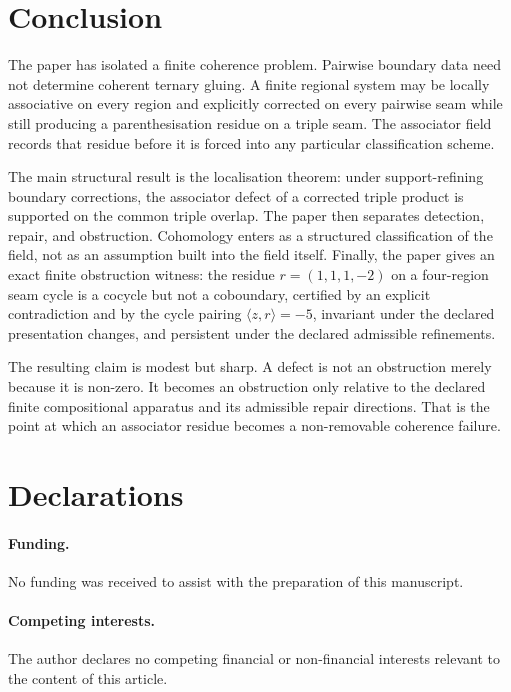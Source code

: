 \documentclass[11pt]{article}
\begin{document}
\section{Conclusion}

The paper has isolated a finite coherence problem. Pairwise boundary data need not determine coherent ternary gluing. A finite regional system may be locally associative on every region and explicitly corrected on every pairwise seam while still producing a parenthesisation residue on a triple seam. The associator field records that residue before it is forced into any particular classification scheme.

The main structural result is the localisation theorem: under support-refining boundary corrections, the associator defect of a corrected triple product is supported on the common triple overlap. The paper then separates detection, repair, and obstruction. Cohomology enters as a structured classification of the field, not as an assumption built into the field itself. Finally, the paper gives an exact finite obstruction witness: the residue \(r=(1,1,1,-2)\) on a four-region seam cycle is a cocycle but not a coboundary, certified by an explicit contradiction and by the cycle pairing \(\langle z,r\rangle=-5\), invariant under the declared presentation changes, and persistent under the declared admissible refinements.

The resulting claim is modest but sharp. A defect is not an obstruction merely because it is non-zero. It becomes an obstruction only relative to the declared finite compositional apparatus and its admissible repair directions. That is the point at which an associator residue becomes a non-removable coherence failure.

\section*{Declarations}

\paragraph{Funding.}
No funding was received to assist with the preparation of this manuscript.

\paragraph{Competing interests.}
The author declares no competing financial or non-financial interests relevant to the content of this article.
\end{document}
